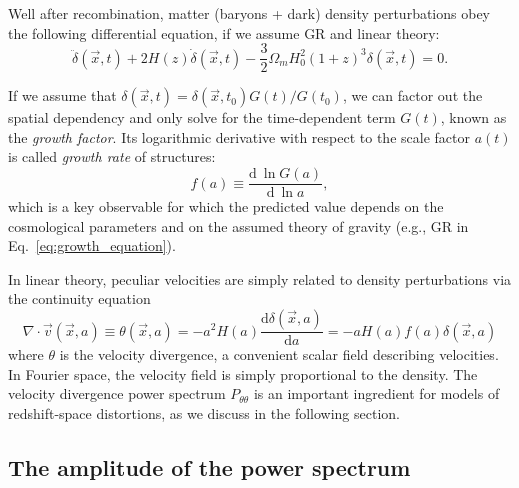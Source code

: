     
    Well after recombination,
    matter (baryons + dark) density perturbations obey the following differential equation, if we 
    assume GR and linear theory:
    \begin{equation}
        \ddot\delta(\vec{x}, t) + 2H(z)\dot\delta(\vec{x}, t) - \frac{3}{2} \Omega_m H_0^2 (1+z)^3 \delta(\vec{x}, t) = 0. 
        \label{eq:growth_equation}
    \end{equation}

    If we assume that $\delta(\vec{x}, t) = \delta(\vec{x}, t_0) G(t)/G(t_0)$, we can factor out 
    the spatial dependency and only solve for the time-dependent term $G(t)$, known as the 
    \emph{growth factor}. Its logarithmic derivative with respect to the scale factor $a(t)$ 
    is called \emph{growth rate} of structures:
    \begin{equation}
        f(a) \equiv \frac{ \mathrm{d}~ \ln G(a)}{\mathrm{d}~ \ln a},
        \label{eq:growth_rate}
    \end{equation}
    which is a key observable for which the predicted value 
    depends on the cosmological parameters and on the assumed
    theory of gravity (e.g., GR in Eq.~\ref{eq:growth_equation}). 

    In linear theory, peculiar velocities are simply related to 
    density perturbations via the continuity equation 
    \begin{equation}
        \nabla \cdot \vec{v}(\vec{x}, a) 
            \equiv \theta(\vec{x}, a) 
            = -a^2 H(a) \frac{\mathrm{d}\delta(\vec{x}, a)}{\mathrm{d}a} 
            = -a H(a) f(a) \delta(\vec{x}, a) 
        \label{eq:velocity_from_density}
    \end{equation}
    where $\theta$ is the velocity divergence, a convenient scalar field describing velocities. 
    In Fourier space, the velocity field is simply proportional to the density. 
    The velocity divergence power spectrum $P_{\theta \theta}$ is an important ingredient 
    for models of redshift-space distortions, as we discuss in the following section. 

    \subsection{The amplitude of the power spectrum}
    \label{intro:lss:amplitude_power_spectrum} 
    
